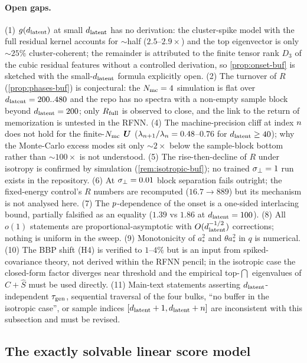 \paragraph{Open gaps.}
(1) $g(d_{\mathrm{latent}})$ at small $d_{\mathrm{latent}}$ has no derivation: the cluster-spike model with the full residual kernel accounts for $\sim$half ($2.5$--$2.9\times$) and the top eigenvector is only $\sim25\%$ cluster-coherent; the remainder is attributed to the finite tensor rank $D_3$ of the cubic residual features without a controlled derivation, so \cref{prop:onset-buf} is sketched with the small-$d_{\mathrm{latent}}$ formula explicitly open. (2) The turnover of $R$ (\cref{prop:phases-buf}) is conjectural: the $N_{\rm mc}=4$ simulation is flat over $d_{\mathrm{latent}}=200..480$ and the repo has no spectra with a non-empty sample block beyond $d_{\mathrm{latent}}=200$; only $R_{\rm full}$ is observed to close, and the link to the return of memorization is untested in the RFNN. (4) The machine-precision cliff at index $n$ does not hold for the finite-$N_{\rm mc}$ $\bm{U}$ ($\lambda_{n+1}/\lambda_n=0.48$--$0.76$ for $d_{\mathrm{latent}}\ge40$); why the Monte-Carlo excess modes sit only $\sim2\times$ below the sample-block bottom rather than $\sim100\times$ is not understood. (5) The rise-then-decline of $R$ under isotropy is confirmed by simulation (\cref{rem:isotropic-buf}); no trained $\sigma_{\perp}=1$ run exists in the repository. (6) At $\sigma_{\perp}=0.01$ block separation fails outright; the fixed-energy control's $R$ numbers are recomputed ($16.7\to889$) but its mechanism is not analysed here. (7) The $p$-dependence of the onset is a one-sided interlacing bound, partially falsified as an equality ($1.39$ vs $1.86$ at $d_{\mathrm{latent}}=100$). (8) All $o(1)$ statements are proportional-asymptotic with $O(d_{\mathrm{latent}}^{-1/2})$ corrections; nothing is uniform in the sweep. (9) Monotonicity of $a_*^2$ and $\theta a_*^2$ in $q$ is numerical. (10) The BBP shift (H4) is verified to $1$--$4\%$ but is an input from spiked-covariance theory, not derived within the RFNN pencil; in the isotropic case the closed-form factor diverges near threshold and the empirical top-$\dint$ eigenvalues of $\hat C+\hat S$ must be used directly. (11) Main-text statements asserting $d_{\mathrm{latent}}$-independent $\tau_{\mathrm{gen}}$, sequential traversal of the four bulks, ``no buffer in the isotropic case'', or sample indices $[d_{\mathrm{latent}}+1,d_{\mathrm{latent}}+n]$ are inconsistent with this subsection and must be revised.

\subsection{The exactly solvable linear score model}
\label{app:theory-linear}

